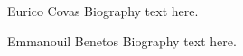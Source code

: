 \documentclass[journal]{IEEEtran}
\begin{document}


%

\begin{IEEEbiographynophoto}{Eurico Covas}
Biography text here.
\end{IEEEbiographynophoto}

\begin{IEEEbiographynophoto}{Emmanouil Benetos}
Biography text here.
\end{IEEEbiographynophoto}







\end{document}
